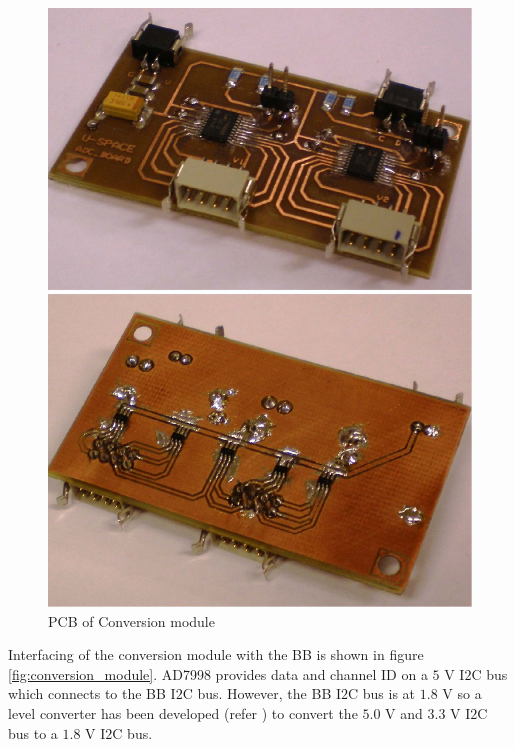 \begin{figure}[bht]
\centering
\includegraphics[scale=0.45]{figures/PCB_conversion_module.pdf}
\caption{\ac{PCB} of Conversion module}
\label{fig:PCB_conversion_module}
\end{figure}
%
Interfacing of the conversion module with the \ac{BB} is shown in figure \ref{fig:conversion_module}. AD7998 provides data and channel ID on a $5$ V I$2$C bus which connects to the BB I$2$C bus. However, the \ac{BB} I$2$C bus is at $1.8$ V so a level converter has been developed (refer \cite{CDR}) to convert the $5.0$ V and $3.3$ V I$2$C bus to a $1.8$ V I$2$C bus.
%
